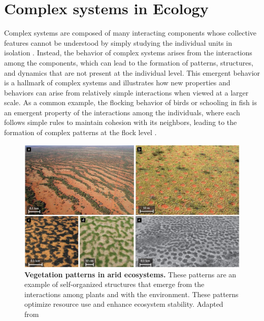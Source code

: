 \section{\label{sec:Complex systems in Ecology} Complex systems in Ecology}

Complex systems are composed of many interacting components
whose collective features cannot be understood by simply studying the
individual units in isolation \cite{Bianconi_2023}. Instead, the behavior of
complex systems arises from the interactions among the components, which can
lead to the formation of patterns, structures, and dynamics that are not
present at the individual level. This emergent behavior is a hallmark of
complex systems and illustrates how new properties and behaviors can arise from
relatively simple interactions when viewed at a larger scale. As a common
example, the flocking behavior of birds or schooling in fish is an emergent
property of the interactions among the individuals, where each follows simple
rules to maintain cohesion with its neighbors, leading to the formation of
complex patterns at the flock level \cite{Vicsek1995}.

\begin{figure}[H]
  \centering
  \includegraphics[width=\textwidth]{Figures/vegetation_patterns.jpg}
  \caption[Vegetation patterns in arid
    ecosystems.]{\label{fig:vegetation_patterns} \textbf{Vegetation patterns in
      arid ecosystems.} These patterns are an example of self-organized
    structures that emerge from the interactions among plants and with the
    environment. These patterns optimize resource use and enhance ecosystem
    stability. Adapted from \cite{Ehud2019}}
\end{figure}

